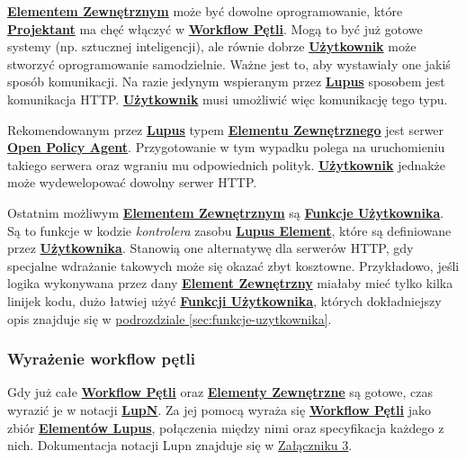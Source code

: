 \hyperlink{def:element-zewnetrzny}{\textbf{Elementem Zewnętrznym}} może być dowolne oprogramowanie, które \hyperlink{def:projektant}{\textbf{Projektant}} ma chęć włączyć w \hyperlink{def:workflow-petli}{\textbf{Workflow Pętli}}. Mogą to być już gotowe systemy (np. sztucznej inteligencji), ale równie dobrze \hyperlink{def:uzytkownik}{\textbf{Użytkownik}} może stworzyć oprogramowanie samodzielnie. Ważne jest to, aby wystawiały one jakiś sposób komunikacji. Na razie jedynym wspieranym przez \hyperlink{def:lupus}{\textbf{Lupus}} sposobem jest komunikacja HTTP. \hyperlink{def:uzytkownik}{\textbf{Użytkownik}} musi umożliwić więc komunikację tego typu.

Rekomendowanym przez \hyperlink{def:lupus}{\textbf{Lupus}} typem \hyperlink{def:element-zewnetrzny}{\textbf{Elementu Zewnętrznego}} jest serwer \hyperlink{def:opa}{\textbf{Open Policy Agent}}. Przygotowanie w tym wypadku polega na uruchomieniu takiego serwera oraz wgraniu mu odpowiednich polityk. \hyperlink{def:uzytkownik}{\textbf{Użytkownik}} jednakże może wydewelopować dowolny serwer HTTP.

Ostatnim możliwym \hyperlink{def:element-zewnetrzny}{\textbf{Elementem Zewnętrznym}} są \hyperlink{def:funkcje-uzytkownika}{\textbf{Funkcje Użytkownika}}. Są to funkcje w kodzie \textit{kontrolera} zasobu \hyperlink{def:element-lupus}{\textbf{Lupus Element}}, które są definiowane przez \hyperlink{def:uzytkownik}{\textbf{Użytkownika}}. Stanowią one alternatywę dla serwerów HTTP, gdy specjalne wdrażanie takowych może się okazać zbyt kosztowne. Przykładowo, jeśli logika wykonywana przez dany \hyperlink{def:element-zewnetrzny}{\textbf{Element Zewnętrzny}} miałaby mieć tylko kilka linijek kodu, dużo łatwiej użyć \hyperlink{def:funkcje-uzytkownika}{\textbf{Funkcji Użytkownika}}, których dokładniejszy opis znajduje się w \hyperref[sec:funkcje-uzytkownika]{podrozdziale \ref{sec:funkcje-uzytkownika}}.


\subsubsection{Wyrażenie workflow pętli}

Gdy już całe \hyperlink{def:workflow-petli}{\textbf{Workflow Pętli}} oraz \hyperlink{def:element-zewnetrzny}{\textbf{Elementy Zewnętrzne}} są gotowe, czas wyrazić je w notacji \hyperlink{def:lupn}{\textbf{LupN}}. Za jej pomocą wyraża się \hyperlink{def:workflow-petli}{\textbf{Workflow Pętli}} jako zbiór \hyperlink{def:element-lupus}{\textbf{Elementów Lupus}}, połączenia między nimi oraz specyfikacja każdego z nich. Dokumentacja notacji Lupn znajduje się w \hyperlink{appendix:3}{Załączniku 3}.

